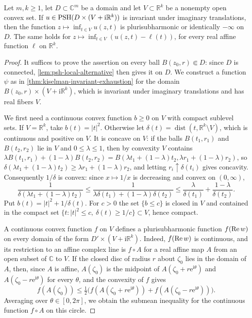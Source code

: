 \begin{corollary}\label{cor:kiselman-product-tube}
Let $m,k\geq1$, let $D\subset\mathbb{C}^m$ be a domain and let $V\subset\mathbb{R}^k$ be a nonempty open convex set. If $u\in\mathrm{PSH}(D\times(V+\mathrm{i}\mathbb{R}^k))$ is invariant under imaginary translations, then the function $z\mapsto\inf_{t\in V}u(z,t)$ is plurisubharmonic or identically $-\infty$ on $D$. The same holds for $z\mapsto\inf_{t\in V}(u(z,t)-\ell(t))$, for every real affine function $\ell$ on $\mathbb R^k$.
\end{corollary}
\begin{proof}
It suffices to prove the assertion on every ball $B(z_0,r)\Subset D$: since $D$ is connected, \cref{lem:psh-local-alternative} then gives it on $D$. We construct a function $\psi$ as in \cref{thm:kiselman-invariant-exhaustion} for the domain $B(z_0,r)\times(V+\mathrm{i}\mathbb R^k)$, which is invariant under imaginary translations and has real fibers $V$.

We first need a continuous convex function $b\geq0$ on $V$ with compact sublevel sets. If $V=\mathbb R^k$, take $b(t)=|t|^2$. Otherwise let $\delta(t)=\operatorname{dist}(t,\mathbb{R}^k\setminus V)$, which is continuous and positive on $V$. It is concave on $V$: if the balls $B(t_1,r_1)$ and $B(t_2,r_2)$ lie in $V$ and $0\leq\lambda\leq1$, then by convexity $V$ contains $\lambda B(t_1,r_1)+(1-\lambda)B(t_2,r_2)=B(\lambda t_1+(1-\lambda)t_2,\lambda r_1+(1-\lambda)r_2)$, so $\delta(\lambda t_1+(1-\lambda)t_2)\geq\lambda r_1+(1-\lambda)r_2$, and letting $r_i\uparrow\delta(t_i)$ gives concavity. Consequently $1/\delta$ is convex: since $x\mapsto1/x$ is decreasing and convex on $(0,\infty)$,
\[
 \frac1{\delta(\lambda t_1+(1-\lambda)t_2)}\leq\frac1{\lambda\delta(t_1)+(1-\lambda)\delta(t_2)}\leq\frac\lambda{\delta(t_1)}+\frac{1-\lambda}{\delta(t_2)}.
\]
Put $b(t)=|t|^2+1/\delta(t)$. For $c>0$ the set $\{b\leq c\}$ is closed in $V$ and contained in the compact set $\{t:|t|^2\leq c,\ \delta(t)\geq1/c\}\subset V$, hence compact.

A continuous convex function $f$ on $V$ defines a plurisubharmonic function $f(\operatorname{Re} w)$ on every domain of the form $D'\times(V+\mathrm{i}\mathbb R^k)$. Indeed, $f(\operatorname{Re} w)$ is continuous, and its restriction to an affine complex line is $f\circ A$ for a real affine map $A$ from an open subset of $\mathbb{C}$ to $V$. If the closed disc of radius $r$ about $\zeta_0$ lies in the domain of $A$, then, since $A$ is affine, $A(\zeta_0)$ is the midpoint of $A(\zeta_0+r\mathrm{e}^{\mathrm{i}\theta})$ and $A(\zeta_0-r\mathrm{e}^{\mathrm{i}\theta})$ for every $\theta$, and the convexity of $f$ gives
\[
 f(A(\zeta_0))\leq\tfrac12\bigl(f(A(\zeta_0+r\mathrm{e}^{\mathrm{i}\theta}))+f(A(\zeta_0-r\mathrm{e}^{\mathrm{i}\theta}))\bigr).
\]
Averaging over $\theta\in[0,2\pi]$, we obtain the submean inequality for the continuous function $f\circ A$ on this circle.


\end{proof}
